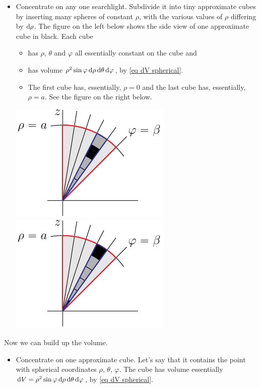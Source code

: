 \begin{eg}
\begin{itemize}
\item 
Concentrate on any one searchlight. Subdivide it into tiny approximate 
cubes by inserting many spheres of constant $\rho$, with the various values of $\rho$ differing by $\mathrm{d}\rho$. The figure on the left below shows the 
side view of one approximate cube in black. Each cube 
\vspace{-\topsep}
\begin{itemize} \itemsep1pt \parskip0pt 
\item
has $\rho$, $\theta$ and $\varphi$ all essentially constant on the cube and
\item
has volume $\rho^2\sin\varphi\,\mathrm{d}\rho\,\mathrm{d}\theta\,\mathrm{d}\varphi$,
by \eqref{eq dV spherical}.
\item 
The first cube has, essentially, $\rho=0$ and the last cube has,
essentially, $\rho=a$.  See the figure on the right below.
\end{itemize}
\vspace{-\topsep}
\begin{efig}
\begin{center}
    \includegraphics{iceCream3.pdf}\qquad
    \includegraphics{iceCream3b.pdf}
\end{center}
\end{efig}
\end{itemize}

Now we can build up the volume.
\begin{itemize}
\item
Concentrate on one approximate cube. Let's say that it contains the point 
with spherical coordinates $\rho$, $\theta$, $\varphi$.
The cube has volume essentially $\mathrm{d}V 
  = \rho^2\sin\varphi\,\mathrm{d}\rho\,\mathrm{d}\theta\,\mathrm{d}\varphi$,
by \eqref{eq dV spherical}.


\end{itemize}
\end{eg}

